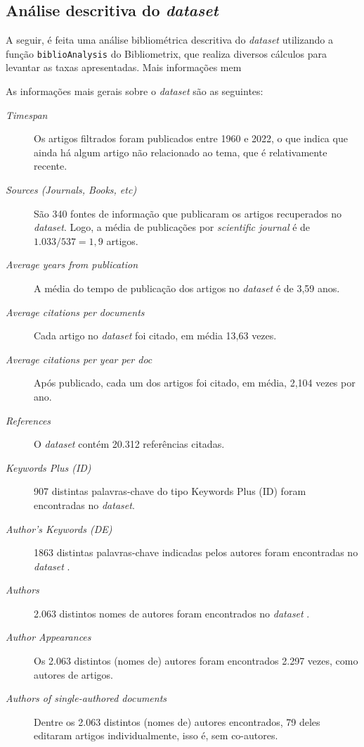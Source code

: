 \subsection{Análise descritiva do \textit{dataset} }

A seguir, é feita uma análise bibliométrica descritiva do \textit{dataset} utilizando a função \texttt{biblioAnalysis} do Bibliometrix, que realiza diversos cálculos para levantar as taxas apresentadas. Mais informações mem 

As informações mais gerais sobre o \textit{dataset} são as seguintes:
\begin{description}
    \item [\textit{Timespan}] Os artigos filtrados foram publicados entre 1960 e 2022, o que indica que ainda há algum artigo não relacionado ao tema, que é relativamente recente.
    \item [\textit{Sources (Journals, Books, etc)}] São 340 fontes de informação que publicaram os artigos recuperados no \textit{dataset}. Logo, a média de publicações por \textit{scientific journal} é de $1.033/537=1,9$ artigos.
    \item [\textit{Average years from publication}] A média do tempo de publicação dos artigos no \textit{dataset} é de 3,59 anos.
    \item [\textit{Average citations per documents}] Cada artigo no \textit{dataset} foi citado, em média 13,63 vezes.
    \item [\textit{Average citations per year per doc}] Após publicado, cada um dos artigos foi citado, em média, 2,104 vezes por ano.
    \item [\textit{References}] O \textit{dataset} contém 20.312 referências citadas.
    \item [\textit{Keywords Plus (ID)}] 907 distintas palavras-chave do tipo Keywords Plus (ID) foram encontradas no \textit{dataset}.
    \item [\textit{Author's Keywords (DE)}] 1863 distintas palavras-chave indicadas pelos autores foram encontradas no \textit{dataset} .
    \item [\textit{Authors}] 2.063 distintos nomes de autores foram encontrados no \textit{dataset} .
    \item [\textit{Author Appearances}] Os 2.063 distintos (nomes de) autores foram encontrados 2.297 vezes, como autores de artigos.
    \item [\textit{Authors of single-authored documents}] Dentre os 2.063 distintos (nomes de) autores encontrados, 79 deles editaram artigos individualmente, isso é, sem co-autores.

\end{description}
